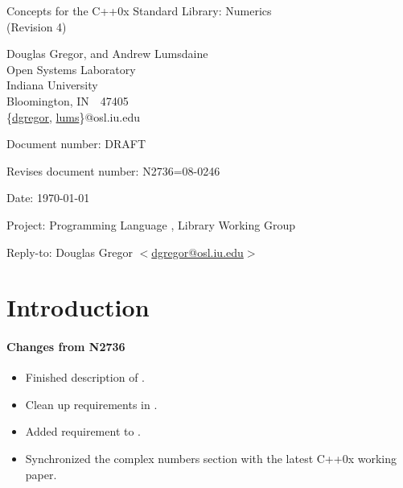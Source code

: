 \documentclass[american,twoside]{book}
\begin{document}
\raggedbottom

\begin{titlepage}
\begin{center}
\huge
Concepts for the C++0x Standard Library: Numerics\\
(Revision 4)

\vspace{0.5in}

\normalsize
Douglas Gregor, and Andrew Lumsdaine \\
Open Systems Laboratory \\
Indiana University \\
Bloomington, IN\ \  47405 \\
\{\href{mailto:dgregor@osl.iu.edu}{dgregor}, \href{mailto:lums@osl.iu.edu}{lums}\}@osl.iu.edu

\end{center}

\vspace{1in}
\par\noindent Document number: DRAFT\vspace{-6pt}
\par\noindent Revises document number: N2736=08-0246\vspace{-6pt}
\par\noindent Date: \today\vspace{-6pt}
\par\noindent Project: Programming Language \Cpp{}, Library Working Group\vspace{-6pt}
\par\noindent Reply-to: Douglas Gregor $<$\href{mailto:dgregor@osl.iu.edu}{dgregor@osl.iu.edu}$>$\vspace{-6pt}

\section*{Introduction}

\paragraph*{Changes from N2736}
\begin{itemize}
\item Finished description of .
\item Clean up  requirements in .
\item Added  requirement to .
\item Synchronized the complex numbers section with the latest C++0x
  working paper.
\end{itemize}


\end{titlepage}
\end{document}
